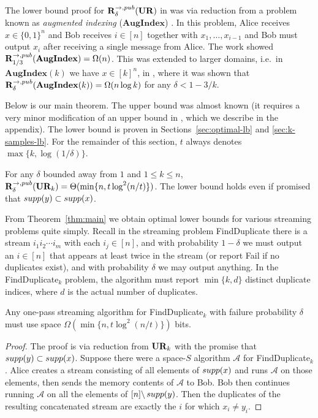 The lower bound proof for $\mathbf{R}^{\rightarrow,pub}_{\delta}(\mathbf{UR})$ in \cite{JowhariST11} was via reduction from a problem known as {\em augmented indexing} ($\mathbf{AugIndex}$) \cite{MiltersenNSW98}. In this problem, Alice receives $x\in\{0,1\}^n$ and Bob receives $i\in[n]$ together with $x_1,\ldots,x_{i-1}$ and Bob must output $x_i$ after receiving a single message from Alice. The work \cite{MiltersenNSW98} showed $\mathbf{R}^{\rightarrow,pub}_{1/3}(\mathbf{AugIndex}) = \Omega(n)$. This was extended to larger domains, i.e.\ in $\mathbf{AugIndex}(k)$ we have $x\in[k]^n$, in \cite{ErgunJS10,JayramW13}, where it was shown that $\mathbf{R}^{\rightarrow,pub}_{\delta}(\mathbf{AugIndex}(k)) = \Omega(n\log k)$ for any $\delta < 1 - 3/k$.

Below is our main theorem. The upper bound was almost known (it requires a very minor modification of an upper bound in \cite{JowhariST11}, which we describe in the appendix). The lower bound is proven in Sections~\ref{sec:optimal-lb} and \ref{sec:k-samples-lb}. For the remainder of this section, $t$ always denotes $\max\{k,\log(1/\delta)\}$.

\begin{theorem}\label{thm:main}
For any $\delta$ bounded away from $1$ and $1\le k\le n$, $\mathbf{R}^{\rightarrow,pub}_\delta(\mathbf{UR}_k) = \Theta(\min\{n, t\log^2(n/t)\})$. The lower bound holds even if promised that $\mathop{supp}(y)\subset \mathop{supp}(x)$.
\end{theorem}

From Theorem~\ref{thm:main} we obtain optimal lower bounds for various streaming problems quite simply. Recall in the streaming problem \textsf{FindDuplicate} there is a stream $i_1 i_2 \cdots i_m$ with each $i_j\in[n]$, and with probability $1-\delta$ we must output an $i\in[n]$ that appears at least twice in the stream (or report \textsf{Fail} if no duplicates exist), and with probability $\delta$ we may output anything. In the \textsf{FindDuplicate}$_k$ problem, the algorithm must report $\min\{k, d\}$ distinct duplicate indices, where $d$ is the actual number of duplicates.

\begin{corollary}
Any one-pass streaming algorithm for \textsf{FindDuplicate}$_k$ with failure probability $\delta$ must use space $\Omega(\min\{n, t\log^2(n/t)\})$ bits.
\end{corollary}
\begin{proof}
The proof is via reduction from $\mathbf{UR}_k$ with the promise that $\mathop{supp}(y)\subset\mathop{supp}(x)$. Suppose there were a space-$S$ algorithm $\mathcal{A}$ for \textsf{FindDuplicate}$_k$. Alice creates a stream consisting of all elements of $\mathop{supp}(x)$ and runs $\mathcal{A}$ on those elements, then sends the memory contents of $\mathcal{A}$ to Bob. Bob then continues running $\mathcal{A}$ on all the elements of $[n]\backslash\mathop{supp}(y)$. Then the duplicates of the resulting concatenated stream are exactly the $i$ for which $x_i\neq y_i$.
\end{proof}

